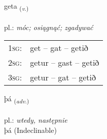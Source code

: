 \documentclass[frontgrid, backgrid]{flacards}\usepackage[]{graphicx}\usepackage[]{xcolor}
\begin{document}
\renewcommand{\blhead}{\vskip5pt {\small\bfseries\footnotesize Sagnorð | czasownik }}
\renewcommand{\bcfoot}{\vskip5pt \hspace{2pt}{\small\bfseries\footnotesize 1K}}


{geta \small{\textsubscript{(\textit{v.})}} \\[1ex] %
\textphonetic{[cɛːta]} \\
pl.: \emph{móc; osiągnąć; zgadywać} \\  [2ex]
\renewcommand*{\arraystretch}{0.8}
\begin{tabular}{p{1cm}l}
\textsc{1sg}: & get -- gat -- getið \\ 
\textsc{2sg}: & getur -- gast -- getið \\ 
\textsc{3sg}: & getur -- gat -- getið \\ 
\end{tabular}
}


\renewcommand{\flhead}{\vskip5pt \fboxsep=0pt {\small\bfseries\footnotesize Atviksorð | przysłówek}}
\renewcommand{\fcfoot}{\vskip5pt \fboxsep=0pt \hspace{2pt}{\small\bfseries\footnotesize 1K}}

\renewcommand{\blhead}{\vskip5pt {\small\bfseries\footnotesize Atviksorð | przysłówek }}
\renewcommand{\bcfoot}{\vskip5pt \hspace{2pt}{\small\bfseries\footnotesize 1K}}


{þá \small{\textsubscript{(\textit{adv.})}} \\[1ex]
\textphonetic{[θauː]} \\
pl.: \emph{wtedy, następnie} \\  [2ex]
þá (Indeclinable)}

\renewcommand{\flhead}{\vskip5pt \fboxsep=0pt {\small\bfseries\footnotesize Sagnorð | czasownik}}
\renewcommand{\fcfoot}{\vskip5pt \fboxsep=0pt \hspace{2pt}{\small\bfseries\footnotesize 1K}}

\renewcommand{\blhead}{\vskip5pt {\small\bfseries\footnotesize Sagnorð | czasownik }}
\renewcommand{\bcfoot}{\vskip5pt \hspace{2pt}{\small\bfseries\footnotesize 1K}}
\end{document}
